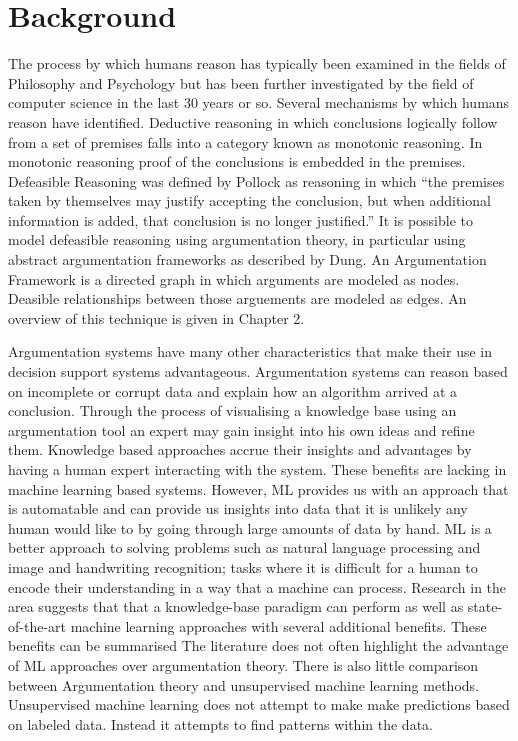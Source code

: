\section{Background}
The process by which humans reason has typically been examined in the fields of Philosophy and Psychology but has been further investigated by the field of computer science in the last 30 years or so. Several mechanisms by which humans reason have identified.
Deductive reasoning in which conclusions logically follow from a set of premises falls into a category known as monotonic reasoning. In monotonic reasoning proof of the conclusions is embedded in the premises.
Defeasible Reasoning was defined by Pollock as reasoning in which ``the premises taken by themselves may justify accepting the conclusion, but when additional information is added, that conclusion is no longer justified.''\cite{pollock1987defeasible}
It is possible to model defeasible reasoning using argumentation theory, in particular using abstract argumentation frameworks as described by Dung.\cite{dung1995acceptability} An Argumentation Framework is a directed graph in which arguments are modeled as nodes. Deasible relationships between those arguements are modeled as edges. An overview of this technique is given in Chapter 2.

Argumentation systems have many other characteristics that make their use in decision support systems advantageous. Argumentation systems can reason based on incomplete or corrupt data and explain how an algorithm arrived at a conclusion. Through the process of visualising a knowledge base using an argumentation tool an expert may gain insight into his own ideas and refine them. 
Knowledge based approaches accrue their insights and advantages by having a human expert interacting with the system. These benefits are lacking in machine learning based systems. However, ML provides us with an approach that is automatable and can provide us insights into data that it is unlikely any human would like to by going through large amounts of data by hand. ML is a better approach to solving problems such as natural language processing and image and handwriting recognition; tasks where it is difficult for a human to encode their understanding in a way that a machine can process.
Research in the area suggests that that a knowledge-base paradigm can perform as well as state-of-the-art machine learning approaches with several additional benefits. These benefits can be summarised The literature does not often highlight the advantage of ML approaches over argumentation theory. 
There is also little comparison between Argumentation theory and unsupervised machine learning methods. Unsupervised machine learning does not attempt to make make predictions based on labeled data. Instead it attempts to find patterns within the data.



